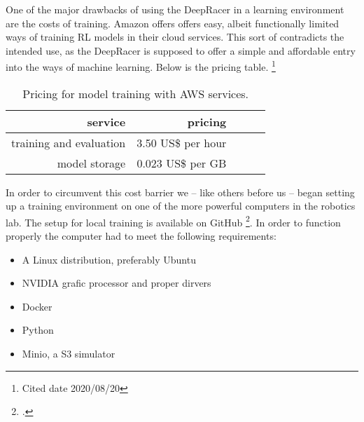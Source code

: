  One of the major drawbacks of using the DeepRacer in a learning environment are the costs of training. Amazon offers offers easy, albeit functionally limited ways of training RL models in their cloud services. This sort of contradicts the intended use, as the DeepRacer is supposed to offer a simple and affordable entry into the ways of machine learning. Below is the pricing table. \footnote{Cited date 2020/08/20}
 \begin{table}
 \caption{Pricing for model training with AWS services.}
 \label{tab:services}
 \centering
 \setlength{\tabcolsep}{5mm}
 \def\arraystretch{1.25}
 \begin{tabular}{|r|r|c|c|c|}
 \hline
 \textbf{service} & \textbf{pricing} \\
 \hline\hline
 training and evaluation & 3.50 US\$ per hour \\
 \hline
 model storage & 0.023 US\$ per GB \\
 \hline
 \end{tabular}
 \end{table}
 In order to circumvent this cost barrier we -- like others before us -- began setting up a training environment on one of the more powerful computers in the robotics lab.
 The setup for local training is available on GitHub \footcite{https://github.com/aws-deepracer-community/deepracer}. In order to function properly the computer had to meet the following requirements:
 \begin{itemize}
 \item A Linux distribution, preferably Ubuntu
 \item NVIDIA grafic processor and proper dirvers
 \item Docker
 \item Python
 \item Minio, a S3 simulator
 \end{itemize}